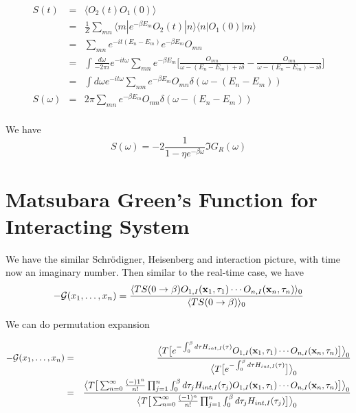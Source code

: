 \documentclass[12pt]{book}
\begin{document}
	\begin{eqnarray}
		S(t)&=&\langle O_2(t) O_1(0)\rangle\\
		&=&\frac 1Z\sum_{mn}\langle m|e^{-\beta E_m}O_2(t)|n\rangle\langle n|O_1(0)|m\rangle\\
		&=&\sum_{mn}e^{-it (E_n-E_m)}e^{-\beta E_m}O_{mn}\\
		&=&\int\frac{d\omega}{-2\pi i}e^{-it\omega}\sum_{mn}e^{-\beta E_m}\Big[\frac{O_{mn}}{\omega-(E_n-E_m)+i\delta}-\frac{O_{mn}}{\omega-(E_n-E_m)-i\delta}\Big]\\
		&=&\int d\omega e^{-it\omega}\sum_{nm}e^{-\beta E_m}O_{mn}\delta(\omega-(E_n-E_m))\\
		S(\omega)&=&2\pi\sum_{mn}e^{-\beta E_m}O_{mn}\delta(\omega-(E_n-E_m))\\
	\end{eqnarray}
	
	We have
	\begin{equation}
		S(\omega)=-2\frac 1{1-\eta e^{-\beta\omega}}\Im G_R(\omega)
	\end{equation}
			
	
	\section{Matsubara Green's Function for Interacting System}
	We have the similar Schr\"odigner, Heisenberg and interaction picture, with time now an imaginary number. Then similar to the real-time case, we have
	\begin{equation}
		-\mathcal G(x_1,\dots,x_n)=\frac{\langle TS(0\rightarrow\beta)O_{1,I}({\bf x}_1,\tau_1)\cdots O_{n,I}({\bf x}_n,\tau_n)\rangle_0}{\langle TS(0\rightarrow\beta)\rangle_0}
	\end{equation}
	
	We can do permutation expansion
	
	\begin{eqnarray}
		-\mathcal G(x_1,\dots,x_n)&=&\frac{\big\langle T\big[e^{-\int_0^\beta d\tau H_{int,I}(\tau)}O_{1,I}({\bf x}_1,\tau_1)\cdots O_{n,I}({\bf x}_n,\tau_n)\big]\big\rangle_0}{\big\langle T\big[e^{-\int_0^\beta d\tau H_{int,I}(\tau)}\big]\big\rangle_0}\\
		&=&\frac{\big\langle T\big[\sum_{n=0}^\infty \frac{(-)1^n}{n!}\prod_{j=1}^n\int_0^\beta d\tau_j H_{int,I}(\tau_j)O_{1,I}({\bf x}_1,\tau_1)\cdots O_{n,I}({\bf x}_n,\tau_n)\big]\big\rangle_0}{\big\langle T\big[\sum_{n=0}^\infty\frac{(-1)^n}{n!}\prod_{j=1}^n\int_0^\beta d\tau_j H_{int,I}(\tau_j)\big]\big\rangle_0}
	\end{eqnarray}
	
\end{document}
